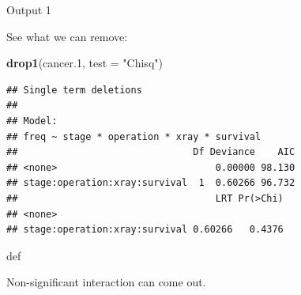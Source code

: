 \documentclass[ignorenonframetext,]{beamer}
\newenvironment{Shaded}{\begin{snugshade}}{\end{snugshade}}
\newcommand{\DataTypeTok}[1]{\textcolor[rgb]{0.13,0.29,0.53}{#1}}
\newcommand{\FloatTok}[1]{\textcolor[rgb]{0.00,0.00,0.81}{#1}}
\newcommand{\KeywordTok}[1]{\textcolor[rgb]{0.13,0.29,0.53}{\textbf{#1}}}
\newcommand{\NormalTok}[1]{#1}
\newcommand{\StringTok}[1]{\textcolor[rgb]{0.31,0.60,0.02}{#1}}
\begin{document}
\begin{frame}[fragile]{Output 1}
\protect\hypertarget{output-1}{}

See what we can remove:

\begin{Shaded}
\begin{Highlighting}[]
\KeywordTok{drop1}\NormalTok{(cancer}\FloatTok{.1}\NormalTok{, }\DataTypeTok{test =} \StringTok{"Chisq"}\NormalTok{)}
\end{Highlighting}
\end{Shaded}

\begin{verbatim}
## Single term deletions
## 
## Model:
## freq ~ stage * operation * xray * survival
##                               Df Deviance    AIC
## <none>                            0.00000 98.130
## stage:operation:xray:survival  1  0.60266 96.732
##                                   LRT Pr(>Chi)
## <none>                                        
## stage:operation:xray:survival 0.60266   0.4376
\end{verbatim}

def

Non-significant interaction can come out.

\end{frame}
\end{document}

